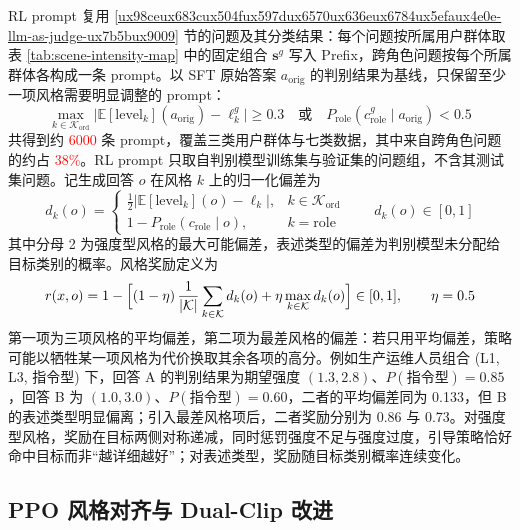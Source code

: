 \documentclass[fontset=fandol,type=master,campus=shenzhen,etitleauto=true]{hithesisbook}
\newcommand{\rev}[1]{\textcolor{red}{#1}}
\begin{document}
RL prompt 复用 \ref{ux98ceux683cux504fux597dux6570ux636eux6784ux5efaux4e0e-llm-as-judge-ux7b5bux9009} 节的问题及其分类结果：每个问题按所属用户群体取表 \ref{tab:scene-intensity-map} 中的固定组合 $\mathbf{s}^{g}$ 写入 Prefix，跨角色问题按每个所属群体各构成一条 prompt。以 SFT 原始答案 $a_{\text{orig}}$ 的判别结果为基线，只保留至少一项风格需要明显调整的 prompt：
\begin{equation}\label{eq:rl-prompt-filter}
\max_{k \in \mathcal{K}_{\text{ord}}} \bigl| \mathbb{E}[\text{level}_k](a_{\text{orig}}) - \ell^{g}_k \bigr| \ge 0.3 \quad \text{或} \quad P_{\text{role}}(c^{g}_{\text{role}} \mid a_{\text{orig}}) < 0.5
\end{equation}
共得到约 \rev{6000} 条 prompt，覆盖三类用户群体与七类数据，其中来自跨角色问题的约占 \rev{38\%}。RL prompt 只取自判别模型训练集与验证集的问题组，不含其测试集问题。记生成回答 $o$ 在风格 $k$ 上的归一化偏差为
\begin{equation}\label{eq:style-deviation}
d_k(o) = \begin{cases} \frac{1}{2}\bigl| \mathbb{E}[\text{level}_k](o) - \ell_k \bigr|, & k \in \mathcal{K}_{\text{ord}} \\ 1 - P_{\text{role}}(c_{\text{role}} \mid o), & k = \text{role} \end{cases} \qquad d_k(o) \in [0, 1]
\end{equation}
其中分母 2 为强度型风格的最大可能偏差，表述类型的偏差为判别模型未分配给目标类别的概率。风格奖励定义为
\begin{equation}\label{eq:intensity-reward}
r(x, o) = 1 - \Bigl[ (1 - \eta)\, \frac{1}{|\mathcal{K}|} \sum_{k \in \mathcal{K}} d_k(o) + \eta \max_{k \in \mathcal{K}} d_k(o) \Bigr] \in [0, 1], \qquad \eta = 0.5
\end{equation}
第一项为三项风格的平均偏差，第二项为最差风格的偏差：若只用平均偏差，策略可能以牺牲某一项风格为代价换取其余各项的高分。例如生产运维人员组合 (L1, L3, 指令型) 下，回答 A 的判别结果为期望强度 $(1.3, 2.8)$、$P(\text{指令型}) = 0.85$，回答 B 为 $(1.0, 3.0)$、$P(\text{指令型}) = 0.60$，二者的平均偏差同为 0.133，但 B 的表述类型明显偏离；引入最差风格项后，二者奖励分别为 0.86 与 0.73。对强度型风格，奖励在目标两侧对称递减，同时惩罚强度不足与强度过度，引导策略恰好命中目标而非“越详细越好”；对表述类型，奖励随目标类别概率连续变化。

\subsection{PPO 风格对齐与 Dual-Clip 改进}\label{ppo-ux98ceux683cux5bf9ux9f50ux4e0e-dual-clip-ux6539ux8fdb}
\end{document}

